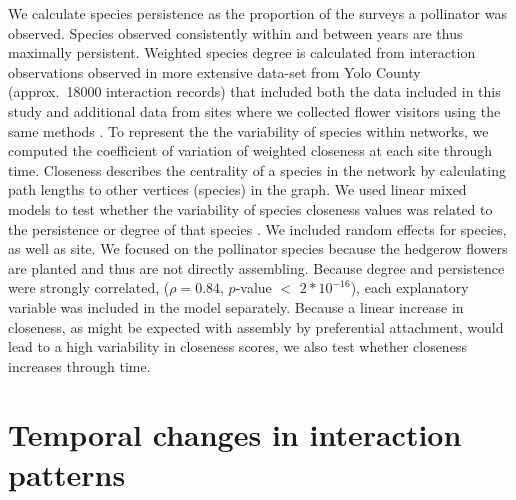 \documentclass[12pt]{article}
\begin{document}
We calculate species persistence as the proportion of the surveys a
pollinator was observed. Species observed consistently within and
between years are thus maximally persistent. Weighted species degree
is calculated from interaction observations observed in more extensive
data-set from Yolo County (approx.~18000 interaction records) that
included both the data included in this study and additional data from
sites where we collected flower visitors using the same methods
\citep{mgonigle-2015-x, ponisio2015farm}. %
To represent the the variability of species within networks, we
computed the coefficient of variation of weighted closeness at each
site through time. Closeness describes the centrality of a species in
the network by calculating path lengths to other vertices (species) in
the graph. We used linear mixed models to test whether the variability
of species closeness values was related to the persistence or degree
of that species \citep{lme4, lmetest}. We included random effects for
species, as well as site. We focused on the pollinator species because
the hedgerow flowers are planted and thus are not directly
assembling. Because degree and persistence were strongly correlated,
($\rho = 0.84$, $p$-value $<$ $2*10^{-16}$), each explanatory variable
was included in the model separately. Because a linear increase in
closeness, as might be expected with assembly by preferential
attachment, would lead to a high variability in closeness scores, we
also test whether closeness increases through time.

\section*{Temporal changes in interaction patterns}
\end{document}
